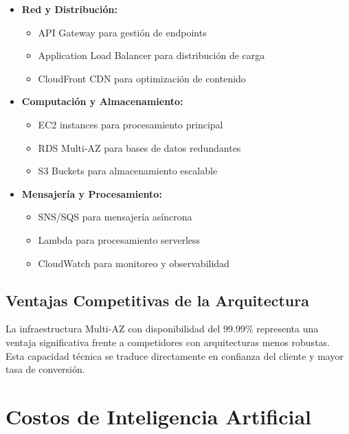 \documentclass[12pt]{article}
\begin{document}
\begin{itemize}
    \item \textbf{Red y Distribución:}
    \begin{itemize}
        \item API Gateway para gestión de endpoints
        \item Application Load Balancer para distribución de carga
        \item CloudFront CDN para optimización de contenido
    \end{itemize}
    
    \item \textbf{Computación y Almacenamiento:}
    \begin{itemize}
        \item EC2 instances para procesamiento principal
        \item RDS Multi-AZ para bases de datos redundantes
        \item S3 Buckets para almacenamiento escalable
    \end{itemize}
    
    \item \textbf{Mensajería y Procesamiento:}
    \begin{itemize}
        \item SNS/SQS para mensajería asíncrona
        \item Lambda para procesamiento serverless
        \item CloudWatch para monitoreo y observabilidad
    \end{itemize}
\end{itemize}

\subsection{Ventajas Competitivas de la Arquitectura}

La infraestructura Multi-AZ con disponibilidad del 99.99\% representa una ventaja significativa frente a competidores con arquitecturas menos robustas. Esta capacidad técnica se traduce directamente en confianza del cliente y mayor tasa de conversión.

\section{Costos de Inteligencia Artificial}
\end{document}
